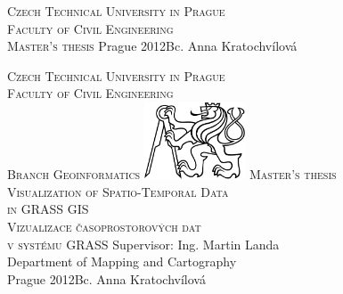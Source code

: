 \begin{center}
\newcommand{\napisCVUT}{Czech Technical University in Prague}
\newcommand{\napisFS}{Faculty of Civil Engineering}
\newcommand{\napisObor}{Branch Geoinformatics}
\newcommand{\napisKatedra}{Department of Mapping and Cartography}
\newcommand{\napisVedouci}{Ing. Martin Landa}
\newcommand{\napisAutor}{Bc. Anna Kratochvílová}
\newcommand{\napisNazevI}{Visualization of Spatio-Temporal Data}
\newcommand{\napisNazevII}{in GRASS GIS}
\newcommand{\napisNazevAJI}{Vizualizace časoprostorových dat}
\newcommand{\napisNazevAJII}{v systému GRASS}
\newcommand{\napisBakalarka}{Master's thesis}
\newcommand{\napisPraha}{Prague 2012}
\newcommand{\napisDatum}{Prague 2012}
%
\newcommand{\velka}[1]{\textsc{#1}}
%
%
\newif\ifpatitul
\patitultrue


\ifpatitul
{\Large\velka{\napisCVUT}}\\
\velka{\Large\napisFS}\\
\vfill
{\LARGE\velka{\napisBakalarka}}
\vfill
{\large\napisPraha\hfill\napisAutor}
\newpage
\fi%

\cleardoublepage

{\Large\velka{\napisCVUT}}\\
{\Large\velka{\napisFS}}\\
{\Large\velka{\napisObor}}
\vfill
\includegraphics[width=3cm]{logo_cvut_black} %
\vfill
{\Large\velka{\napisBakalarka}}\\
{\Large\velka{\napisNazevI\\
\napisNazevII}}
{\\\bigskip\large\velka{\napisNazevAJI\\
\napisNazevAJII}}
\vfill
{\large%
Supervisor: \napisVedouci\\
\napisKatedra\\
\bigskip
\bigskip
\napisDatum\hfill\napisAutor}
\end{center}
